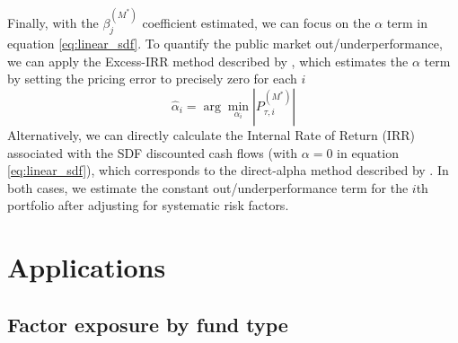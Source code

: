 \documentclass[12pt]{article}
\begin{document}
Finally, with the $\beta_j^{(M^*)}$ coefficient estimated, we can focus on the $\alpha$ term in equation \ref{eq:linear_sdf}.
To quantify the public market out/underperformance, we can apply the Excess-IRR method described by \cite{PG09}, which estimates the $\alpha$ term by setting the pricing error to precisely zero for each $i$
\[
\hat{\alpha}_i = \arg \min_{\alpha_i} \left| P_{\tau, i}^{(M^*)}  \right|
\]
Alternatively, we can directly calculate the Internal Rate of Return (IRR) associated with the SDF discounted cash flows (with $\alpha=0$ in equation \ref{eq:linear_sdf}), which corresponds to the direct-alpha method described by \cite{GGS14}.
In both cases, we estimate the constant out/underperformance term for the $i$th portfolio after adjusting for systematic risk factors.

\section{Applications}
\label{sec:applications}

\subsection{Factor exposure by fund type}
\label{sec:factor_exposure}
\end{document}
